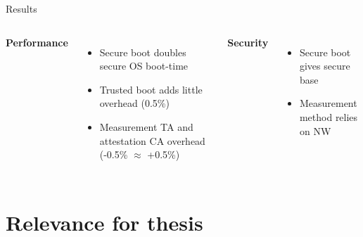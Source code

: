 \documentclass[]{beamer}
\begin{document}
\begin{frame}{Results}
\begin{columns}
\noindent\textbf{Performance}
\begin{itemize}
\item Secure boot doubles secure OS boot-time
\item Trusted boot adds little overhead (0.5\%)
\item Measurement TA and attestation CA overhead (-0.5\% $\approx$ +0.5\%)
\end{itemize}
\noindent\textbf{Security}
\begin{itemize}
\item Secure boot gives secure base
\item Measurement method relies on NW
\end{itemize}
\end{columns}
\end{frame}

\section{Relevance for thesis}
\end{document}
